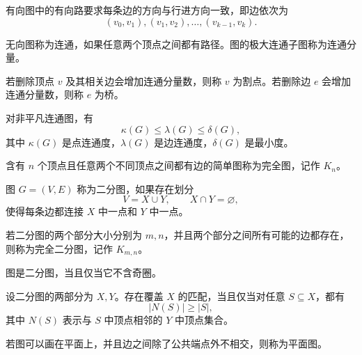 \begin{definition}[有向图中的路]
有向图中的有向路要求每条边的方向与行进方向一致，即边依次为
\[
    (v_0,v_1),(v_1,v_2),\dots,(v_{k-1},v_k).
\]
\end{definition}

\begin{definition}[连通性]
无向图称为连通，如果任意两个顶点之间都有路径。图的极大连通子图称为连通分量。
\end{definition}

\begin{definition}[割点与桥]
若删除顶点 $v$ 及其相关边会增加连通分量数，则称 $v$ 为割点。若删除边 $e$ 会增加连通分量数，则称 $e$ 为桥。
\end{definition}

\begin{theorem}
对非平凡连通图，有
\[
    \kappa(G)\le \lambda(G)\le \delta(G),
\]
其中 $\kappa(G)$ 是点连通度，$\lambda(G)$ 是边连通度，$\delta(G)$ 是最小度。
\end{theorem}

\begin{definition}[完全图]
含有 $n$ 个顶点且任意两个不同顶点之间都有边的简单图称为完全图，记作 $K_n$。
\end{definition}

\begin{definition}[二分图]
图 $G=(V,E)$ 称为二分图，如果存在划分
\[
    V=X\cup Y,
    \qquad X\cap Y=\varnothing,
\]
使得每条边都连接 $X$ 中一点和 $Y$ 中一点。
\end{definition}

\begin{definition}[完全二分图]
若二分图的两个部分大小分别为 $m,n$，并且两个部分之间所有可能的边都存在，则称为完全二分图，记作 $K_{m,n}$。
\end{definition}

\begin{theorem}[二分图的刻画]
图是二分图，当且仅当它不含奇圈。
\end{theorem}

\begin{theorem}
设二分图的两部分为 $X,Y$。存在覆盖 $X$ 的匹配，当且仅当对任意 $S\subseteq X$，都有
\[
    |N(S)|\ge |S|,
\]
其中 $N(S)$ 表示与 $S$ 中顶点相邻的 $Y$ 中顶点集合。
\end{theorem}

\begin{definition}[平面图]
若图可以画在平面上，并且边之间除了公共端点外不相交，则称为平面图。
\end{definition}

